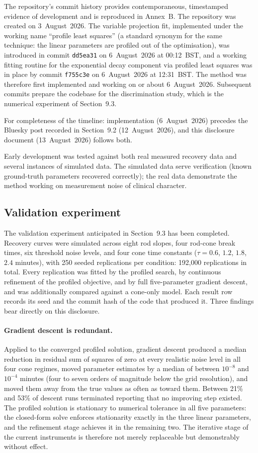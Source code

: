 \documentclass[11pt,a4paper]{article}
\begin{document}
The repository's commit history provides contemporaneous, timestamped
evidence of development and is reproduced in Annex~B. The repository was
created on 3~August~2026. The variable projection fit, implemented under
the working name ``profile least squares'' (a standard synonym for the
same technique: the linear parameters are profiled out of the
optimisation), was introduced in commit \texttt{dd5ea31} on
6~August~2026 at 00:12~BST, and a working fitting routine for the
exponential decay component via profiled least squares was in place by
commit \texttt{f755c3e} on 6~August~2026 at 12:31~BST. The method was
therefore first implemented and working on or about 6~August~2026.
Subsequent commits prepare the codebase for the discrimination study,
which is the numerical experiment of Section~9.3.

For completeness of the timeline: implementation (6~August~2026) precedes
the Bluesky post recorded in Section~9.2 (12~August~2026), and this
disclosure document (13~August~2026) follows both.

Early development was tested against both real measured recovery data and
several instances of simulated data. The simulated data serve verification
(known ground-truth parameters recovered correctly); the real data
demonstrate the method working on measurement noise of clinical
character.

\subsection{Validation experiment}
The validation experiment anticipated in Section~9.3 has been completed.
Recovery curves were simulated across eight rod slopes, four rod-cone
break times, six threshold noise levels, and four cone time constants
($\tau = 0.6$, $1.2$, $1.8$, $2.4$ minutes), with 250 seeded replications
per condition: 192{,}000 replications in total. Every replication was
fitted by the profiled search, by continuous refinement of the profiled
objective, and by full five-parameter gradient descent, and was
additionally compared against a cone-only model. Each result row records
its seed and the commit hash of the code that produced it. Three findings
bear directly on this disclosure.

\paragraph{Gradient descent is redundant.}
Applied to the converged profiled solution, gradient descent produced a
median reduction in residual sum of squares of zero at every realistic
noise level in all four cone regimes, moved parameter estimates by a
median of between $10^{-8}$ and $10^{-4}$ minutes (four to seven orders of
magnitude below the grid resolution), and moved them away from the true
values as often as toward them. Between 21\% and 53\% of descent runs
terminated reporting that no improving step existed. The profiled
solution is stationary to numerical tolerance in all five parameters:
the closed-form solve enforces stationarity exactly in the three linear
parameters, and the refinement stage achieves it in the remaining two.
The iterative stage of the current instruments is therefore not merely
replaceable but demonstrably without effect.
\end{document}
